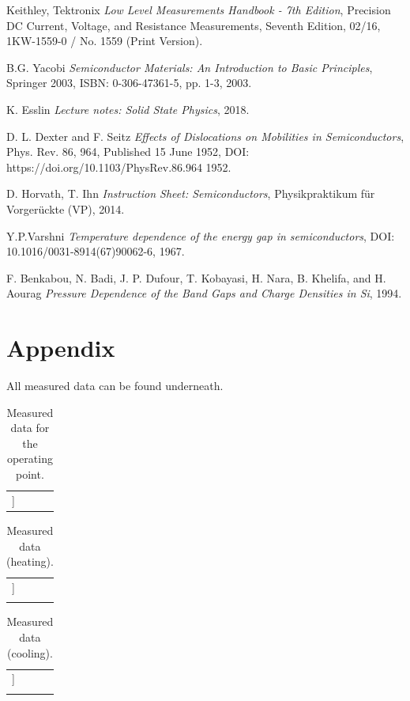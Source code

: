 \documentclass[a4paper]{article}
\begin{document}
\begin{thebibliography}{9}

  Keithley, Tektronix
  \textit{Low Level Measurements Handbook - 7th Edition},
  Precision DC Current, Voltage, and Resistance Measurements,
  Seventh Edition,
  02/16,
  1KW-1559-0 / No. 1559 (Print Version).

  B.G. Yacobi
  \textit{Semiconductor Materials: An Introduction to Basic Principles},
  Springer 2003,
  ISBN: 0-306-47361-5,
  pp. 1-3,
  2003.

  K. Esslin
  \textit{Lecture notes: Solid State Physics},
  2018.

  D. L. Dexter and F. Seitz
  \textit{Effects of Dislocations on Mobilities in Semiconductors},
  Phys. Rev. 86, 964,
  Published 15 June 1952,
  DOI: https://doi.org/10.1103/PhysRev.86.964
  1952.

  D. Horvath, T. Ihn 
  \textit{Instruction Sheet: Semiconductors},
  Physikpraktikum für Vorgerückte (VP),
  2014.

  Y.P.Varshni
  \textit{Temperature dependence of the energy gap in semiconductors},
  DOI: 10.1016/0031-8914(67)90062-6,
  1967.

  F. Benkabou, N. Badi, J. P. Dufour, T. Kobayasi, H. Nara, B. Khelifa, and H. Aourag 
  \textit{Pressure Dependence of the Band Gaps and Charge Densities in Si},
  1994.


\end{thebibliography}

\newpage
\section{Appendix}

All measured data can be found underneath.
\newline

\begin{table}[H]
\centering
\begin{tabular}{r|rr|r}
\hline
[[table:operatingPoint]]
\end{tabular}
\caption{Measured data for the operating point.}
\label{tab:operating_point}
\end{table}

\begin{longtable}{r|rrr} 
\hline
[[table:data:heating]] \\
\caption{Measured data (heating).}
\label{tab:heating}
\end{longtable}

\begin{longtable}{r|rrr} 
\hline
[[table:data:cooling]] \\
\caption{Measured data (cooling).}
\label{tab:cooling}
\end{longtable}
\end{document}
